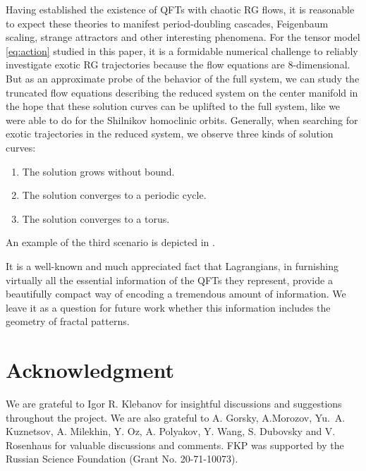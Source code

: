 Having established the existence of QFTs with chaotic RG flows, it is reasonable to expect these theories to manifest period-doubling cascades, Feigenbaum scaling, strange attractors and other interesting phenomena. For the tensor model \cref{eq:action} studied in this paper, it is a formidable numerical challenge to reliably investigate exotic RG trajectories because the flow equations are 8-dimensional. But as an approximate probe of the behavior of the full system, we can study the truncated flow equations describing the reduced system on the center manifold in the hope that these solution curves can be uplifted to the full system, like we were able to do for the Shilnikov homoclinic orbits. Generally, when searching for exotic trajectories in the reduced system, we observe three kinds of solution curves:
\begin{enumerate}
\item The solution grows without bound.
\item The solution converges to a periodic cycle.
\item The solution converges to a torus.
\end{enumerate}
An example of the third scenario is depicted in .

It is a well-known and much appreciated fact that Lagrangians, in furnishing virtually all the essential information of the QFTs they represent, provide a beautifully compact way of encoding a tremendous amount of information. We leave it as a question for future work whether this information includes the geometry of fractal patterns.



\section{Acknowledgment}

We are grateful to Igor R. Klebanov for insightful discussions and suggestions throughout the project. We are also grateful to A. Gorsky, A.Morozov, Yu.\ A. Kuznetsov, A. Milekhin, Y. Oz,  A. Polyakov, Y. Wang, S. Dubovsky and V. Rosenhaus for valuable discussions and comments. 
FKP was supported by the Russian Science Foundation (Grant No. 20-71-10073).

